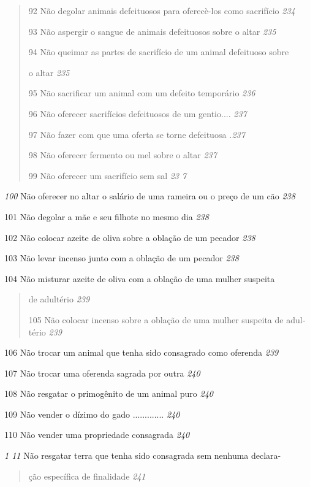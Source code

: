 \begin{quote}
92 Não degolar animais defeituosos para oferecè-los como sacrifício
\emph{234}

93 Não aspergir o sangue de animais defeituosos sobre o altar \emph{235}

94 Não queimar as partes de sacrifício de um animal defeituoso sobre

o altar \emph{235}

95 Não sacrificar um animal com um defeito temporário \emph{236}

96 Não oferecer sacrifícios defeituosos de um gentio.... \emph{237}

97 Não fazer com que uma oferta se torne defeituosa \emph{.237}

98 Não oferecer fermento ou mel sobre o altar \emph{237}

99 Não oferecer um sacrifício sem sal \emph{23 7}
\end{quote}

\emph{100} Não oferecer no altar o salário de uma rameira ou o preço de
um cão \emph{238}

101 Não degolar a mãe e seu filhote no mesmo dia \emph{238}

102 Não colocar azeite de oliva sobre a oblação de um pecador \emph{238}

103 Não levar incenso junto com a oblação de um pecador \emph{238}

104 Não misturar azeite de oliva com a oblação de uma mulher suspeita

\begin{quote}
de adultério \emph{239}

105 Não colocar incenso sobre a oblação de uma mulher suspeita de
adul­tério \emph{239}
\end{quote}

106 Não trocar um animal que tenha sido consagrado como oferenda
\emph{239}

107 Não trocar uma oferenda sagrada por outra \emph{240}

108 Não resgatar o primogênito de um animal puro \emph{240}

109 Não vender o dízimo do gado ............. \emph{240}

110 Não vender uma propriedade consagrada \emph{240}

\emph{1 11} Não resgatar terra que tenha sido consagrada sem nenhuma
declara-

\begin{quote}
ção específica de finalidade \emph{241}
\end{quote}


